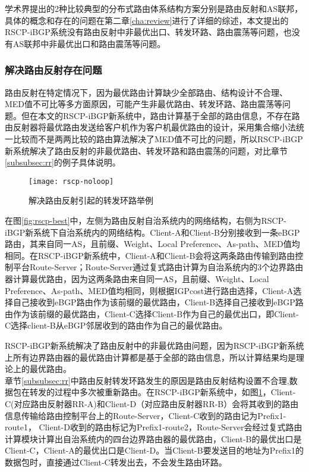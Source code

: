 学术界提出的2种比较典型的分布式路由体系结构方案分别是路由反射和AS联邦，具体的概念和存在的问题在第二章\ref{cha:review}进行了详细的综述，本文提出的RSCP-iBGP系统没有路由反射中非最优出口、转发环路、路由震荡等问题，也没有AS联邦中非最优出口和路由震荡等问题。
\subsubsection{解决路由反射存在问题}



路由反射在特定情况下，因为最优路由计算缺少全部路由、结构设计不合理、MED值不可比等多方面原因，可能产生非最优路由、转发环路、路由震荡等问题。但在本文的RSCP-iBGP新系统中，路由计算基于全部的路由信息，不存在路由反射器将最优路由发送给客户机作为客户机最优路由的设计，采用集合缩小法统一比较而不是两两比较的路由算法解决了MED值不可比的问题，所以RSCP-iBGP新系统解决了路由反射的非最优路由、转发环路和路由震荡的问题，对比章节\ref{subsubsec:rr}的例子具体说明。\\

\begin{figure}
  \centering
  \texttt{[image: rscp-noloop]}
  \caption{解决路由反射引起的转发环路举例}
  \label{fig:rscp-noloop}
\end{figure}

在图\ref{fig:rscp-best}中，左侧为路由反射自治系统内的网络结构，右侧为RSCP-iBGP新系统下自治系统内的网络结构。Client-A和Client-B分别接收到一条eBGP路由，其来自同一AS，且前缀、Weight、Local Preference、As-path、MED值均相同。在RSCP-iBGP新系统中，Client-A和Client-B会将这两条路由传输到路由控制平台Route-Server；Route-Server通过复式路由计算为自治系统内的3个边界路由器计算最优路由，因为这两条路由来自同一AS，且前缀、Weight、Local Preference、As-path、MED值均相同，则根据IGPcost进行路由选择，Client-A选择自己接收到eBGP路由作为该前缀的最优路由，Client-B选择自己接收到eBGP路由作为该前缀的最优路由，Client-C选择Client-B作为自己的最优出口，即Client-C选择client-B从eBGP邻居收到的路由作为自己的最优路由。

RSCP-iBGP新系统解决了路由反射中的非最优路由问题，因为RSCP-iBGP新系统上所有边界路由器的最优路由计算都是基于全部的路由信息，所以计算结果均是理论上的最优路由。\\




章节\ref{subsubsec:rr}中路由反射转发环路发生的原因是路由反射结构设置不合理,数据包在转发的过程中多次被重新路由。在RSCP-iBGP新系统中，如图\ref{fig:rscp-noloop}，Client-C(对应路由反射器RR-A)和Client-D（对应路由反射器RR-B）会将其收到的路由信息传输给路由控制平台上的Route-Server，Client-C收到的路由记为Prefix1-route1， Client-D收到的路由标记为Prefix1-route2，Route-Server会经过复式路由计算模块计算出自治系统内的四台边界路由器的最优路由，Client-B的最优出口是Client-C，Client-A的最优出口是Client-D。当Client-B要发送目的地址为Prefix1的数据包时，直接通过Client-C转发出去，不会发生路由环路。\\

